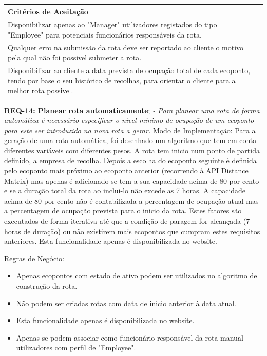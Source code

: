 \documentclass{scrreprt}
\begin{document}
		\begin{tabular}{|p{5.8in}|p{0.7in}|} \hline 
		\underline{Critérios de Aceitação} \\ \hline 
		Disponibilizar apenas ao "Manager" utilizadores registados do tipo "Employee" para potenciais funcionários responsáveis da rota.\\ \hline
		Qualquer erro na submissão da rota deve ser reportado ao cliente o motivo pela qual não foi possivel submeter a rota.\\ \hline
		Disponibilizar ao cliente a data prevista de ocupação total de cada ecoponto, tendo por base o seu histórico de recolhas, para orientar o cliente para a melhor rota possivel. \\ \hline
	\end{tabular}\newline\newline
	
	\textbf{REQ-14: Planear rota automaticamente};\newline
	\textit{- Para planear uma rota de forma automática é necessário especificar o nivel mínimo de ocupação de um ecoponto para este ser introduzido na nova rota a gerar.}
	 \newline\newline
		\underline{Modo de Implementação: }Para a geração de uma rota automática, foi desenhado um algoritmo que tem em conta diferentes variáveis com diferentes pesos. A rota tem inicio num ponto de partida definido, a empresa de recolha. Depois a escolha do ecoponto seguinte é definida pelo ecoponto mais próximo ao ecoponto anterior (recorrendo à API Distance Matrix) mas apenas é adicionado se tem a sua capacidade acima de 80 por cento e se a duração total da rota ao inclui-lo não excede as 7 horas. A capacidade acima de 80 por cento não é contabilizada a percentagem de ocupação atual mas a percentagem de ocupação prevista para o inicio da rota. Estes fatores são executados de forma iterativa até que a condição de paragem for alcançada (7 horas de duração) ou não existirem mais ecopontos que cumpram estes requisitos anteriores. Esta funcionalidade apenas é disponibilizada no website.\newline\newline
		
		\underline{Regras de Negócio: } 
		\begin{itemize}
		\item Apenas ecopontos com estado de ativo podem ser utilizados no algoritmo de construção da rota.
		\item Não podem ser criadas rotas com data de inicio anterior à data atual.
	    \item  Esta funcionalidade apenas é disponibilizada no website.
	    \item Apenas se podem associar como funcionário responsável da rota manual utilizadores com perfil de "Employee". 
	\end{itemize}
	
\end{document}
